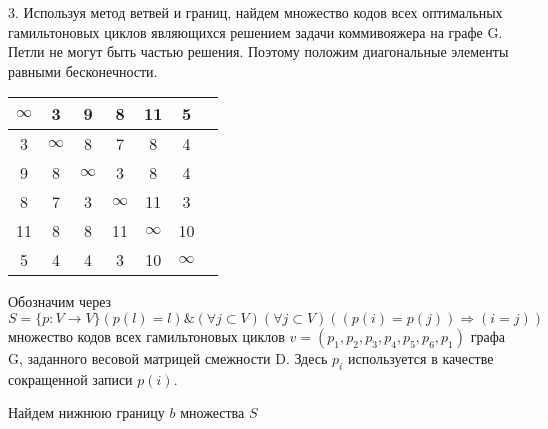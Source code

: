 \documentclass[a4paper,10pt]{article} %
\begin{document}
\smallskip

3. \quad Используя метод ветвей и границ, найдем множество кодов всех оптимальных гамильтоновых
 циклов являющихся решением задачи коммивояжера на графе G.
Петли не могут быть частью решения. Поэтому положим диагональные элементы равными бесконечности.

\begin{flushleft}\begin{tabular}[]{|c|c|c|c|c|c|c|}
\hline
$\infty$ &    3 &    9 &    8 &   11 &    5 \\
\hline
  3 &  $\infty$ &    8 &    7 &    8 &    4 \\
\hline
  9 &    8 &  $\infty$ &    3 &    8 &    4 \\
\hline
  8 &    7 &    3 &  $\infty$ &   11 &    3 \\
\hline
 11 &    8 &    8 &   11 &  $\infty$ &   10 \\
\hline
  5 &    4 &    4 &    3 &   10 &  $\infty$ \\
\hline
\end{tabular}
\end{flushleft}


Обозначим через
$ S = \{ p:V \rightarrow V \} (p(l) = l) \& ( \forall j \subset V ) ( \forall j \subset V) ((p(i) = p(j)) \Longrightarrow (i = j))$
множество кодов всех гамильтоновых циклов $v=(p_1,p_2,p_3,p_4,p_5,p_6,p_1)$ графа G, 
заданного весовой матрицей смежности D. 
Здесь $p_{i}$ используется в качестве сокращенной записи $p(i)$.

Найдем нижнюю границу $b$ множества $S$


\captionsetup{justification=raggedright,
singlelinecheck=false
}

\captionsetup[subfloat]{labelformat=empty}
\end{document}
